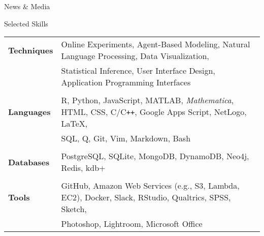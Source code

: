 \documentclass{cv} %
\begin{document}

\begin{cvSectionEmpty}{News \& Media}
    \printbibliography[heading=none, keyword=media]
\end{cvSectionEmpty}


\begin{cvSection}{Selected Skills}

\begin{tabular}{ @{} >{\bfseries}l @{\hspace{1em}} l }
Techniques &  Online Experiments, Agent-Based Modeling, Natural Language Processing, Data Visualization,
\\
& Statistical Inference, User Interface Design, Application Programming Interfaces
\\\\
Languages &  R, Python, JavaScript, MATLAB, \textit{Mathematica}, HTML, CSS, C/C\texttt{++}, Google Apps Script, NetLogo, \LaTeX{},
\\
& SQL, Q, Git, Vim, Markdown, Bash
\\\\
Databases & PostgreSQL, SQLite, MongoDB, DynamoDB, Neo4j, Redis, kdb+
\\\\
Tools & GitHub, Amazon Web Services (e.g., S3, Lambda, EC2), Docker, Slack, RStudio, Qualtrics, SPSS, Sketch,
\\
& Photoshop, Lightroom, Microsoft Office
\end{tabular}

\end{cvSection}
\end{document}
